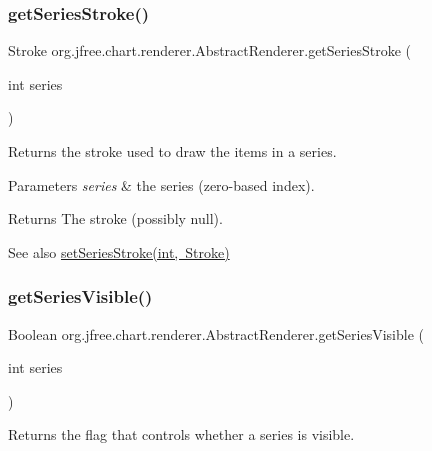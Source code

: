 \subsubsection{\texorpdfstring{get\+Series\+Stroke()}{getSeriesStroke()}}
{\footnotesize\ttfamily Stroke org.\+jfree.\+chart.\+renderer.\+Abstract\+Renderer.\+get\+Series\+Stroke (\begin{DoxyParamCaption}\item[{int}]{series }\end{DoxyParamCaption})}

Returns the stroke used to draw the items in a series.


\begin{DoxyParams}{Parameters}
{\em series} & the series (zero-\/based index).\\
\hline
\end{DoxyParams}
\begin{DoxyReturn}{Returns}
The stroke (possibly {\ttfamily null}).
\end{DoxyReturn}
\begin{DoxySeeAlso}{See also}
\mbox{\hyperlink{classorg_1_1jfree_1_1chart_1_1renderer_1_1_abstract_renderer_a3cc8ebf3993621a79db959209be1b184}{set\+Series\+Stroke(int, Stroke)}} 
\end{DoxySeeAlso}
\mbox{\label{classorg_1_1jfree_1_1chart_1_1renderer_1_1_abstract_renderer_a4807cc403de1b6e06fcbbdebee5b5ed4}} 
\subsubsection{\texorpdfstring{get\+Series\+Visible()}{getSeriesVisible()}\hspace{0.1cm}{\footnotesize\ttfamily [1/2]}}
{\footnotesize\ttfamily Boolean org.\+jfree.\+chart.\+renderer.\+Abstract\+Renderer.\+get\+Series\+Visible (\begin{DoxyParamCaption}\item[{int}]{series }\end{DoxyParamCaption})}

Returns the flag that controls whether a series is visible.


